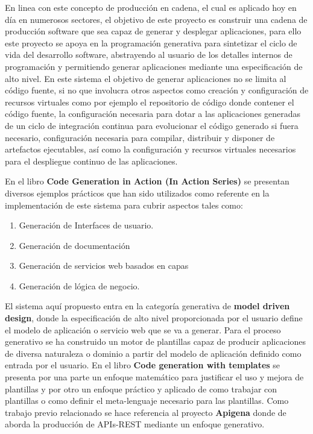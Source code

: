 \documentclass[a4paper,11pt]{book}
\begin{document}
En linea con este concepto de producción en cadena, el cual es aplicado hoy en día en numerosos sectores, el objetivo de este proyecto es construir una cadena de producción software que sea capaz de generar y desplegar aplicaciones, para ello este proyecto se apoya en la programación generativa para sintetizar el ciclo de vida del desarrollo software, abstrayendo al usuario de los detalles internos de programación y permitiendo generar aplicaciones mediante una especificación de alto nivel. En este sistema el objetivo  de generar aplicaciones no se limita al código fuente, si no que involucra otros aspectos como creación y configuración de recursos virtuales como por ejemplo el repositorio de código donde contener el código fuente, la configuración necesaria para dotar a las aplicaciones generadas de un ciclo de integración continua para evolucionar el código generado si fuera necesario, configuración necesaria para compilar, distribuir y disponer de artefactos ejecutables, así como  la configuración y recursos virtuales necesarios para el despliegue continuo de las aplicaciones.
 
En el libro \textbf{Code Generation in Action (In Action Series)}\cite{codeg} se presentan diversos ejemplos prácticos que han sido utilizados como referente en la implementación de este sistema para cubrir aspectos tales como:

\begin{enumerate}
\item Generación de Interfaces de usuario. 
\item Generación de documentación
\item Generación de servicios web basados en capas
\item Generación de lógica de negocio. 
\end{enumerate}


El sistema aquí propuesto entra en la categoría generativa de \textbf{model driven design}, donde la especificación de alto nivel proporcionada por el usuario define el modelo de aplicación o servicio web  que se va a generar. Para el proceso generativo se ha construido un motor de plantillas capaz de producir aplicaciones de diversa naturaleza o dominio a partir del modelo de aplicación definido como entrada por el usuario.  En el libro \textbf{Code generation with templates}\cite{templates} se presenta por una parte un enfoque matemático para justificar el uso y mejora de plantillas y por otro un enfoque práctico y aplicado de como trabajar con plantillas o como definir el meta-lenguaje necesario para las plantillas.  Como trabajo previo relacionado se hace referencia al proyecto \textbf{Apigena}\cite{apigena} donde de aborda la producción de APIs-REST mediante un enfoque generativo. 
\end{document}
